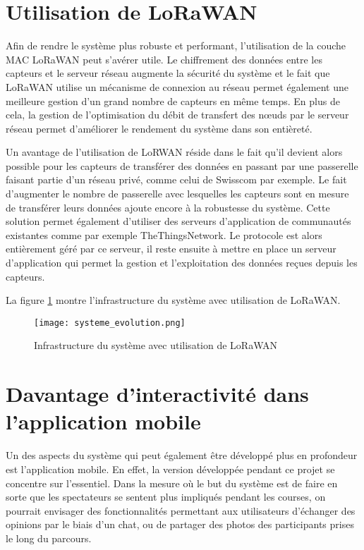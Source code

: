 \section{Utilisation de LoRaWAN}

Afin de rendre le système plus robuste et performant, l'utilisation de la couche MAC LoRaWAN peut s’avérer utile. Le chiffrement des données entre les capteurs et le serveur réseau augmente la sécurité du système et le fait que LoRaWAN utilise un mécanisme de connexion au réseau permet également une meilleure gestion d'un grand nombre de capteurs en même temps. En plus de cela, la gestion de l'optimisation du débit de transfert des nœuds par le serveur réseau permet d'améliorer le rendement du système dans son entièreté.

Un avantage de l'utilisation de LoRWAN réside dans le fait qu'il devient alors possible pour les capteurs de transférer des données en passant par une passerelle faisant partie d'un réseau privé, comme celui de Swisscom par exemple. Le fait d'augmenter le nombre de passerelle avec lesquelles les capteurs sont en mesure de transférer leurs données ajoute encore à la robustesse du système. Cette solution permet également d'utiliser des serveurs d'application de communautés existantes comme par exemple TheThingsNetwork. Le protocole est alors entièrement géré par ce serveur, il reste ensuite à mettre en place un serveur d'application qui permet la gestion et l'exploitation des données reçues depuis les capteurs.

La figure \ref{fig:sys_infra_evol} montre l'infrastructure du système avec utilisation de LoRaWAN.

\begin{figure}[tb]
\centering 
\texttt{[image: systeme\_evolution.png]} 
\caption{Infrastructure du système avec utilisation de LoRaWAN}
\label{fig:sys_infra_evol}
\end{figure}

\section{Davantage d'interactivité dans l'application mobile}

Un des aspects du système qui peut également être développé plus en profondeur est l'application mobile. En effet, la version développée pendant ce projet se concentre sur l’essentiel. Dans la mesure où le but du système est de faire en sorte que les spectateurs se sentent plus impliqués pendant les courses, on pourrait envisager des fonctionnalités permettant aux utilisateurs d'échanger des opinions par le biais d'un chat, ou de partager des photos des participants prises le long du parcours. 

